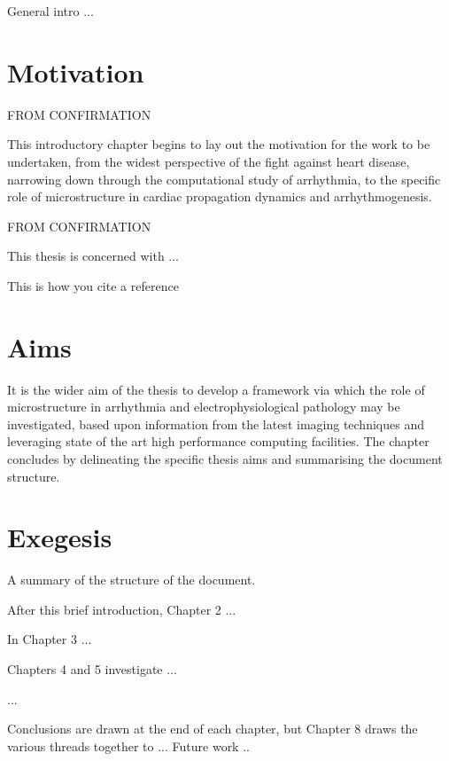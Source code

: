 
General intro ...

\section{Motivation}
\label{sec:intro:motivation}
FROM CONFIRMATION

      This introductory chapter begins to lay out the motivation for the work to be undertaken, from the widest perspective of the fight against heart disease, narrowing down through the computational study of arrhythmia, to the specific role of microstructure in cardiac propagation dynamics and arrhythmogenesis.
      
FROM CONFIRMATION

This thesis is concerned with ...

This is how you cite a reference \cite{citeulike:1448130}

\section{Aims}
\label{sec:intro:aims}
It is the wider aim of the thesis to develop a framework via which the role of microstructure in arrhythmia and electrophysiological pathology may be investigated, based upon information from the latest imaging techniques and leveraging state of the art high performance computing facilities. The chapter concludes by delineating the specific thesis aims and summarising the document structure.

\section{Exegesis}
\label{sec:intro:exegesis}
A summary of the structure of the document.

After this brief introduction, Chapter 2 ...

In Chapter 3 ...

Chapters 4 and 5 investigate ...

...

Conclusions are drawn at the end of each chapter,
but Chapter 8 draws the various threads together to ...
Future work ..


